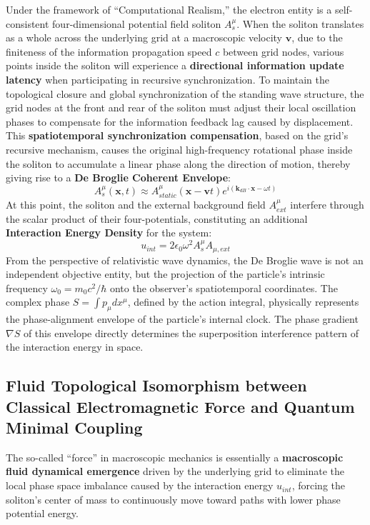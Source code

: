 \documentclass[12pt, a4paper]{article}
\begin{document}
Under the framework of ``Computational Realism,'' the electron entity is a self-consistent four-dimensional potential field soliton $A^\mu_s$. When the soliton translates as a whole across the underlying grid at a macroscopic velocity $\mathbf{v}$, due to the finiteness of the information propagation speed $c$ between grid nodes, various points inside the soliton will experience a \textbf{directional information update latency} when participating in recursive synchronization. To maintain the topological closure and global synchronization of the standing wave structure, the grid nodes at the front and rear of the soliton must adjust their local oscillation phases to compensate for the information feedback lag caused by displacement. This \textbf{spatiotemporal synchronization compensation}, based on the grid's recursive mechanism, causes the original high-frequency rotational phase inside the soliton to accumulate a linear phase along the direction of motion, thereby giving rise to a \textbf{De Broglie Coherent Envelope}:
\begin{equation}
    A^\mu_s(\mathbf{x}, t) \approx A^\mu_{static}(\mathbf{x}-\mathbf{v}t) e^{i(\mathbf{k}_{dB} \cdot \mathbf{x} - \omega t)}
\end{equation}
At this point, the soliton and the external background field $A^\mu_{ext}$ interfere through the scalar product of their four-potentials, constituting an additional \textbf{Interaction Energy Density} for the system:
\begin{equation}
    u_{int} = 2 \epsilon_0 \omega^2 A^\mu_s A_{\mu,ext}
\end{equation}
From the perspective of relativistic wave dynamics, the De Broglie wave is not an independent objective entity, but the projection of the particle's intrinsic frequency $\omega_0 = m_0 c^2 / \hbar$ onto the observer's spatiotemporal coordinates. The complex phase $S = \int p_\mu dx^\mu$, defined by the action integral, physically represents the phase-alignment envelope of the particle's internal clock. The phase gradient $\nabla S$ of this envelope directly determines the superposition interference pattern of the interaction energy in space.

\subsection{Fluid Topological Isomorphism between Classical Electromagnetic Force and Quantum Minimal Coupling}

The so-called ``force'' in macroscopic mechanics is essentially a \textbf{macroscopic fluid dynamical emergence} driven by the underlying grid to eliminate the local phase space imbalance caused by the interaction energy $u_{int}$, forcing the soliton's center of mass to continuously move toward paths with lower phase potential energy.
\end{document}
